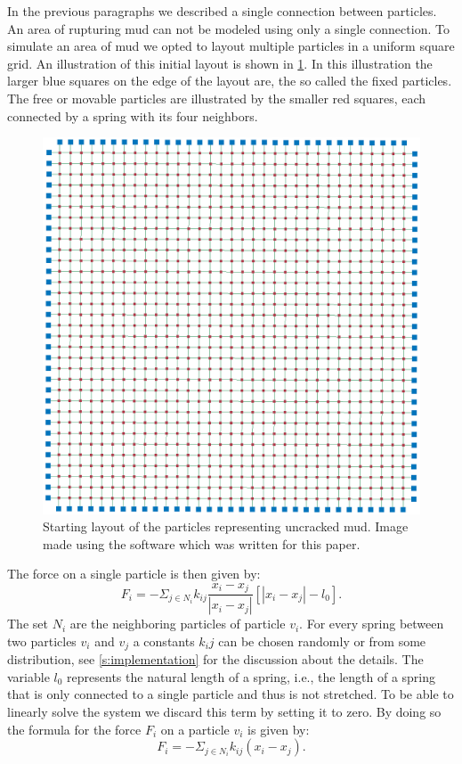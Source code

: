 In the previous paragraphs we described a single connection between particles. An area of rupturing mud can not be modeled using only a single connection. To simulate an area of mud we opted to layout multiple particles in a uniform square grid. An illustration of this initial layout is shown in \cref{fig:model:layout}. In this illustration the larger blue squares on the edge of the layout are, the so called the fixed particles. The free or movable particles are illustrated by the smaller red squares, each connected by a spring with its four neighbors. 
%
\begin{figure}
	\centering
	\includegraphics[width=0.9\columnwidth]{img/uniform_square_grid.png}
	\caption{Starting layout of the particles representing uncracked mud. Image made using the software which was written for this paper.}
	\label{fig:model:layout}
\end{figure}
%
The force on a single particle is then given by:
%
\begin{equation}\label{eq:single:force}
	F_i = - \Sigma_{j \in N_i} k_{ij} \frac{x_i - x_j}{|x_i - x_j|}[|x_i - x_j| - l_0].
\end{equation}
%
The set $N_i$ are the neighboring particles of particle $v_i$. For every spring between two particles $v_i$ and $v_j$ a constants $k_ij$ can be chosen randomly or from some distribution, see \cref{s:implementation} for the discussion about the details. The variable $l_0$ represents the natural length of a spring, i.e., the length of a spring that is only connected to a single particle and thus is not stretched. To be able to linearly solve the system we discard this term by setting it to zero. By doing so the formula for the force $F_i$ on a particle $v_i$ is given by:
%
\begin{equation}\label{eq:single:force:simple}
	F_i = - \Sigma_{j \in N_i} k_{ij}(x_i - x_j).
\end{equation}

